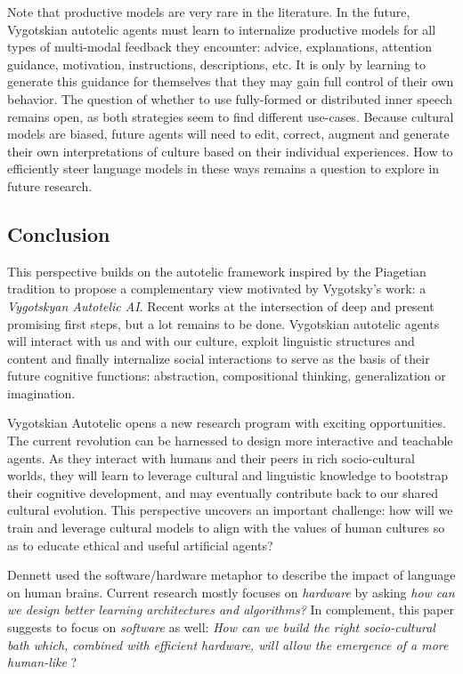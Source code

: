 Note that productive models are very rare in the literature. In the future, Vygotskian autotelic agents must learn to internalize productive models for all types of multi-modal feedback they encounter: advice, explanations, attention guidance, motivation, instructions, descriptions, etc. It is only by learning to generate this guidance for themselves that they may gain full control of their own behavior. The question of whether to use fully-formed or distributed inner speech remains open, as both strategies seem to find different use-cases. Because cultural models are biased, future agents will need to edit, correct, augment and generate their own interpretations of culture based on their individual experiences. How to efficiently steer language models in these ways remains a question to explore in future research. 


\subsection*{Conclusion}

This perspective builds on the autotelic \rl framework inspired by the Piagetian tradition to propose a complementary view motivated by Vygotsky's work: a \textit{Vygotskyan Autotelic AI}. Recent works at the intersection of deep \rl and \nlp present promising first steps, but a lot remains to be done. Vygotskian autotelic agents will interact with us and with our culture, exploit linguistic structures and content and finally internalize social interactions to serve as the basis of their future cognitive functions: abstraction, compositional thinking, generalization or imagination. 

Vygotskian Autotelic \ai opens a new research program with exciting opportunities. The current \nlp revolution can be harnessed to design more interactive and teachable agents. As they interact with humans and their peers in rich socio-cultural worlds, they will learn to leverage cultural and linguistic knowledge to bootstrap their cognitive development, and may eventually contribute back to our shared cultural evolution. This perspective uncovers an important challenge: how will we train and leverage cultural models to align with the values of human cultures so as to educate ethical and useful artificial agents?

Dennett used the software/hardware metaphor to describe the impact of language on human brains.\cite{dennett_consciousness_1993} Current \ai research mostly focuses on \textit{hardware} by asking \textit{how can we design better learning architectures and algorithms?} In complement, this paper suggests to focus on \textit{software} as well: \textit{How can we build the right socio-cultural bath which, combined with efficient hardware, will allow the emergence of a more human-like \ai}?



